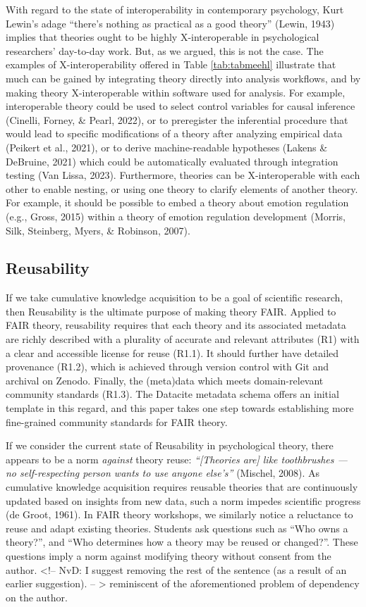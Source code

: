 \documentclass[
  man,floatsintext]{apa6}
\begin{document}
With regard to the state of interoperability in contemporary psychology,
Kurt Lewin's adage ``there's nothing as practical as a good theory'' (Lewin, 1943) implies that theories ought to be highly X-interoperable in psychological researchers' day-to-day work.
But, as we argued, this is not the case.
The examples of X-interoperability offered in Table \ref{tab:tabmeehl} illustrate that much can be gained by integrating theory directly into analysis workflows, and by making theory X-interoperable within software used for analysis.
For example, interoperable theory could be used
to select control variables for causal inference (Cinelli, Forney, \& Pearl, 2022),
or to preregister the inferential procedure that would lead to specific modifications of a theory after analyzing empirical data (Peikert et al., 2021),
or to derive machine-readable hypotheses (Lakens \& DeBruine, 2021) which could be automatically evaluated through integration testing (Van Lissa, 2023).
Furthermore, theories can be X-interoperable with each other to enable nesting, or using one theory to clarify elements of another theory.
For example, it should be possible to embed a theory about emotion regulation (e.g., Gross, 2015) within a theory of emotion regulation development (Morris, Silk, Steinberg, Myers, \& Robinson, 2007).

\subsection{Reusability}\label{reusability}

If we take cumulative knowledge acquisition to be a goal of scientific research, then Reusability is the ultimate purpose of making theory FAIR.
Applied to FAIR theory, reusability requires that each theory and its associated metadata are richly described with a plurality of accurate and relevant attributes (R1) with a clear and accessible license for reuse (R1.1).
It should further have detailed provenance (R1.2),
which is achieved through version control with Git and archival on Zenodo.
Finally, the (meta)data which meets domain-relevant community standards (R1.3).
The Datacite metadata schema offers an initial template in this regard,
and this paper takes one step towards establishing more fine-grained community standards for FAIR theory.

If we consider the current state of Reusability in psychological theory, there appears to be a norm \emph{against} theory reuse:
\emph{``{[}Theories are{]} like toothbrushes --- no self-respecting person wants to use anyone else's''} (Mischel, 2008).
As cumulative knowledge acquisition requires reusable theories that are continuously updated based on insights from new data, such a norm impedes scientific progress (de Groot, 1961).
In FAIR theory workshops, we similarly notice a reluctance to reuse and adapt existing theories.
Students ask questions such as ``Who owns a theory?'',
and ``Who determines how a theory may be reused or changed?''.
These questions imply a norm against modifying theory without consent from the author. \textless!-- NvD: I suggest removing the rest of the sentence (as a result of an earlier suggestion). -- \textgreater{} reminiscent of the aforementioned problem of dependency on the author.
\end{document}
